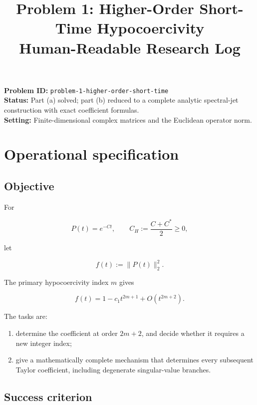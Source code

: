\documentclass[11pt,a4paper]{article}
\title{\textbf{Problem 1: Higher-Order Short-Time Hypocoercivity}\\[0.5em]
\large Human-Readable Research Log}
\author{}
\date{}
\providecommand{\tightlist}{%
  \setlength{\itemsep}{0pt}\setlength{\parskip}{0pt}}
\begin{document}
\maketitle
\thispagestyle{empty}

\begin{center}
\begin{minipage}{0.92\textwidth}
\small
\textbf{Problem ID:} \texttt{problem-1-higher-order-short-time}\\[0.35em]
\textbf{Status:} Part (a) solved; part (b) reduced to a complete analytic spectral-jet construction with exact coefficient formulas.\\[0.35em]
\textbf{Setting:} Finite-dimensional complex matrices and the Euclidean operator norm.
\end{minipage}
\end{center}

\vspace{0.75em}
{\small\tableofcontents}
\clearpage
{}

\section{Operational specification}\label{operational-specification}

\subsection{Objective}\label{objective}

For

\[
P(t)=e^{-Ct},\qquad C_H:=\frac{C+C^*}{2}\ge 0,
\]

let

\[
f(t):=\|P(t)\|_2^2.
\]

The primary hypocoercivity index \(m\) gives

\[
f(t)=1-c_1t^{2m+1}+O(t^{2m+2}).
\]

The tasks are:

\begin{enumerate}
\def\labelenumi{\arabic{enumi}.}
\tightlist
\item
  determine the coefficient at order \(2m+2\), and decide whether it requires a new integer index;
\item
  give a mathematically complete mechanism that determines every subsequent Taylor coefficient, including degenerate singular-value branches.
\end{enumerate}

\subsection{Success criterion}\label{success-criterion}
\end{document}
